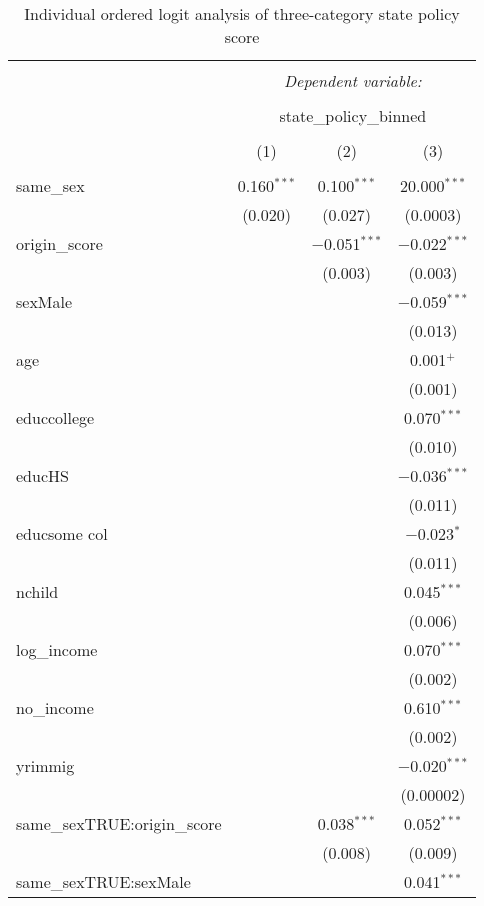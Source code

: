 \documentclass[
  11pt,
]{article}
\begin{document}
\begin{table}[!htbp] \centering 
  \caption{Individual ordered logit analysis of three-category state policy score} 
  \label{tab:ord} 
\begin{tabular}{@{\extracolsep{5pt}}lccc} 
\\[-1.8ex]\hline 
\hline \\[-1.8ex] 
 & \multicolumn{3}{c}{\textit{Dependent variable:}} \\ 
\cline{2-4} 
\\[-1.8ex] & \multicolumn{3}{c}{state\_policy\_binned} \\ 
\\[-1.8ex] & (1) & (2) & (3)\\ 
\hline \\[-1.8ex] 
 same\_sex & 0.160$^{***}$ & 0.100$^{***}$ & 20.000$^{***}$ \\ 
  & (0.020) & (0.027) & (0.0003) \\ 
  origin\_score &  & $-$0.051$^{***}$ & $-$0.022$^{***}$ \\ 
  &  & (0.003) & (0.003) \\ 
  sexMale &  &  & $-$0.059$^{***}$ \\ 
  &  &  & (0.013) \\ 
  age &  &  & 0.001$^{+}$ \\ 
  &  &  & (0.001) \\ 
  educcollege &  &  & 0.070$^{***}$ \\ 
  &  &  & (0.010) \\ 
  educHS &  &  & $-$0.036$^{***}$ \\ 
  &  &  & (0.011) \\ 
  educsome col &  &  & $-$0.023$^{*}$ \\ 
  &  &  & (0.011) \\ 
  nchild &  &  & 0.045$^{***}$ \\ 
  &  &  & (0.006) \\ 
  log\_income &  &  & 0.070$^{***}$ \\ 
  &  &  & (0.002) \\ 
  no\_income &  &  & 0.610$^{***}$ \\ 
  &  &  & (0.002) \\ 
  yrimmig &  &  & $-$0.020$^{***}$ \\ 
  &  &  & (0.00002) \\ 
  same\_sexTRUE:origin\_score &  & 0.038$^{***}$ & 0.052$^{***}$ \\ 
  &  & (0.008) & (0.009) \\ 
  same\_sexTRUE:sexMale &  &  & 0.041$^{***}$ \\ 

\end{tabular}
\end{table}
\end{document}
